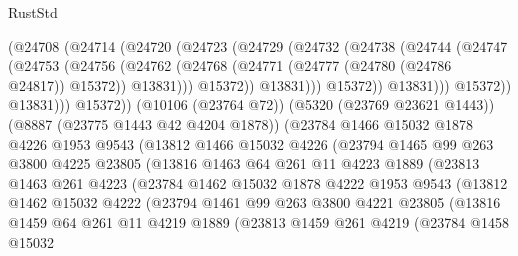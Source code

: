 \begin{lexlean}{RustStd}
\begin{coremodule}
                      (@24708
                        (@24714
                          (@24720
                            (@24723
                              (@24729
                                (@24732
                                  (@24738
                                    (@24744
                                      (@24747
                                        (@24753
                                          (@24756
                                            (@24762
                                              (@24768
                                                (@24771 (@24777 (@24780 (@24786 @24817)) @15372))
                                                @13831)))
                                          @15372))
                                      @13831)))
                                @15372))
                            @13831)))
                      @15372))
                  @13831)))
            @15372))
        (@10106 (@23764 @72))
        (@5320 (@23769 @23621 @1443))
        (@8887 (@23775 @1443 @42 @4204 @1878))
        (@23784
          @1466
          @15032
          @1878
          @4226
          @1953
          @9543
          (@13812
            @1466
            @15032
            @4226
            (@23794
              @1465
              @99
              @263
              @3800
              @4225
              @23805
              (@13816
                @1463
                @64
                @261
                @11
                @4223
                @1889
                (@23813
                  @1463
                  @261
                  @4223
                  (@23784
                    @1462
                    @15032
                    @1878
                    @4222
                    @1953
                    @9543
                    (@13812
                      @1462
                      @15032
                      @4222
                      (@23794
                        @1461
                        @99
                        @263
                        @3800
                        @4221
                        @23805
                        (@13816
                          @1459
                          @64
                          @261
                          @11
                          @4219
                          @1889
                          (@23813
                            @1459
                            @261
                            @4219
                            (@23784
                              @1458
                              @15032

\end{coremodule}
\end{lexlean}
